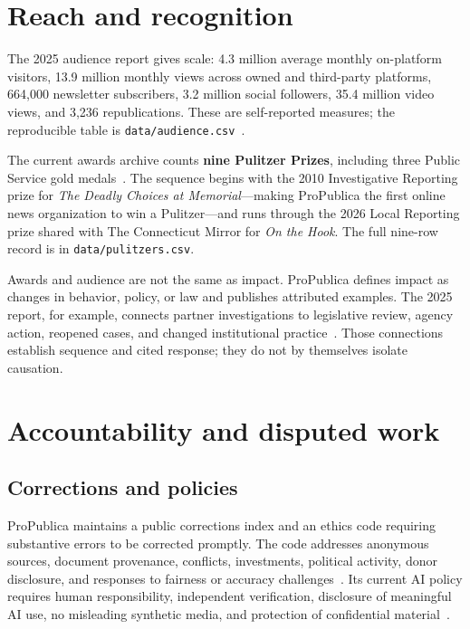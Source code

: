 \documentclass[10pt,letterpaper,twocolumn]{article}
\begin{document}
\section{Reach and recognition}

The 2025 audience report gives scale: 4.3 million average monthly on-platform visitors, 13.9 million monthly views across owned and third-party platforms, 664,000 newsletter subscribers, 3.2 million social followers, 35.4 million video views, and 3,236 republications. These are self-reported measures; the reproducible table is \texttt{data/audience.csv}~\citep{pp2025}.

The current awards archive counts \textbf{nine Pulitzer Prizes}, including three Public Service gold medals~\citep{ppawards,pulitzer2025}. The sequence begins with the 2010 Investigative Reporting prize for \emph{The Deadly Choices at Memorial}---making ProPublica the first online news organization to win a Pulitzer---and runs through the 2026 Local Reporting prize shared with The Connecticut Mirror for \emph{On the Hook}. The full nine-row record is in \texttt{data/pulitzers.csv}.

Awards and audience are not the same as impact. ProPublica defines impact as changes in behavior, policy, or law and publishes attributed examples. The 2025 report, for example, connects partner investigations to legislative review, agency action, reopened cases, and changed institutional practice~\citep{pp2025}. Those connections establish sequence and cited response; they do not by themselves isolate causation.

\section{Accountability and disputed work}

\subsection{Corrections and policies}

ProPublica maintains a public corrections index and an ethics code requiring substantive errors to be corrected promptly. The code addresses anonymous sources, document provenance, conflicts, investments, political activity, donor disclosure, and responses to fairness or accuracy challenges~\citep{ppcorrections,ppethics}. Its current AI policy requires human responsibility, independent verification, disclosure of meaningful AI use, no misleading synthetic media, and protection of confidential material~\citep{ppai}.
\end{document}
